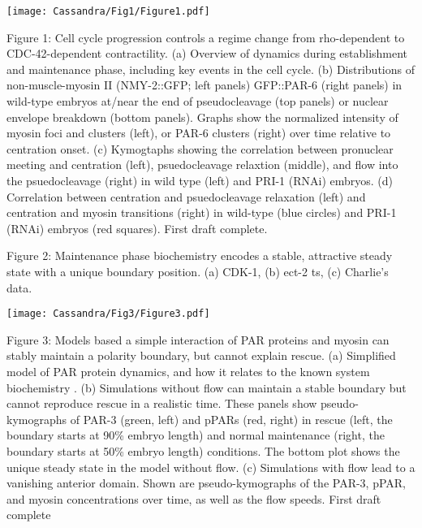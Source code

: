 \documentclass[11pt]{article}
\newcommand{\red}[1]{\color{red}#1\normalcolor}
\newcommand{\6}[1]{#1_{\text{6}}}
\newcommand{\3}[1]{#1_{\text{3}}}
\begin{document}
\newpage 
\begin{center}
\texttt{[image: Cassandra/Fig1/Figure1.pdf]}
\end{center}

\newpage 
Figure 1: Cell cycle progression controls a regime change from rho-dependent to CDC-42-dependent contractility. (a) Overview of dynamics during establishment and maintenance phase, including key events in the cell cycle. (b) Distributions of non-muscle-myosin II (NMY-2::GFP; left panels) GFP::PAR-6 (right panels) in wild-type embryos at/near the end of pseudocleavage (top panels) or nuclear envelope breakdown (bottom panels). Graphs show the normalized intensity of myosin foci and clusters (left), or PAR-6 clusters (right) over time relative to centration onset. (c) Kymogtaphs showing the correlation between pronuclear meeting and centration (left), psuedocleavage relaxtion (middle), and flow into the psuedocleavage (right) in wild type (left) and PRI-1 (RNAi) embryos. (d) Correlation between centration and psuedocleavage relaxation (left) and centration and myosin transitions (right) in wild-type (blue circles) and PRI-1 (RNAi) embryos (red squares). \red{First draft complete.}

\newpage
Figure 2: Maintenance phase biochemistry encodes a stable, attractive steady state with a unique boundary position. (a) CDK-1, (b) ect-2 ts, (c) Charlie's data.

\newpage 
\begin{center}
\texttt{[image: Cassandra/Fig3/Figure3.pdf]}
\end{center}


\newpage
Figure 3: Models based a simple interaction of PAR proteins and myosin can stably maintain a polarity boundary, but cannot explain rescue. (a) Simplified model of PAR protein dynamics, and how it relates to the known system biochemistry \citep{lang2017proteins}. (b) Simulations without flow can maintain a stable boundary but cannot reproduce rescue in a realistic time. These panels show pseudo-kymographs of PAR-3 (green, left) and pPARs (red, right) in rescue (left, the boundary starts at 90\% embryo length) and normal maintenance (right, the boundary starts at 50\% embryo length) conditions. The bottom plot shows the unique steady state in the model without flow. (c) Simulations with flow lead to a vanishing anterior domain. Shown are pseudo-kymographs of the PAR-3, pPAR, and myosin concentrations over time, as well as the flow speeds. \red{First draft complete}
\end{document}
